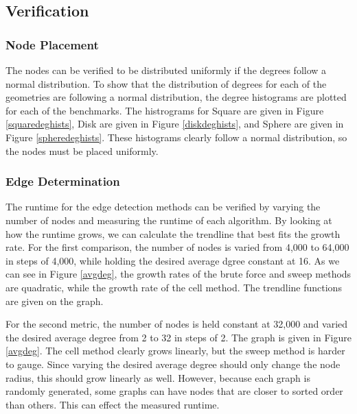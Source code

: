 \documentclass{article}
\begin{document}
    \subsection{Verification}

        \subsubsection{Node Placement}
        The nodes can be verified to be distributed uniformly if the degrees follow a normal distribution. To show that the distribution of degrees for each of the geometries are following a normal distribution, the degree histograms are plotted for each of the benchmarks. The histrograms for Square are given in Figure \ref{squaredeghists}, Disk are given in Figure \ref{diskdeghists}, and Sphere are given in Figure \ref{spheredeghists}. These histograms clearly follow a normal distribution, so the nodes must be placed uniformly.

        \subsubsection{Edge Determination}
        The runtime for the edge detection methods can be verified by varying the number of nodes and measuring the runtime of each algorithm. By looking at how the runtime grows, we can calculate the trendline that best fits the growth rate. For the first comparison, the number of nodes is varied from 4,000 to 64,000 in steps of 4,000, while holding the desired average dgree constant at 16. As we can see in Figure \ref{avgdeg}, the growth rates of the brute force and sweep methods are quadratic, while the growth rate of the cell method. The trendline functions are given on the graph.
        \par
        For the second metric, the number of nodes is held constant at 32,000 and varied the desired average degree from 2 to 32 in steps of 2. The graph is given in Figure \ref{avgdeg}. The cell method clearly grows linearly, but the sweep method is harder to gauge. Since varying the desired average degree should only change the node radius, this should grow linearly as well. However, because each graph is randomly generated, some graphs can have nodes that are closer to sorted order than others. This can effect the measured runtime.
\end{document}
